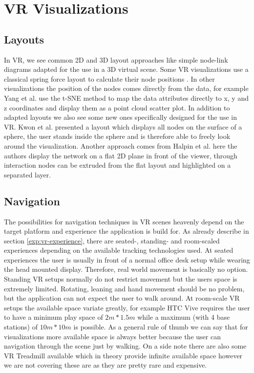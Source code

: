 \section{VR Visualizations}

\subsection{Layouts}

In VR, we see common 2D and 3D layout approaches like simple node-link diagrams adapted for the use in a 3D virtual scene. 
Some VR visualizations use a classical spring force layout to calculate their node positions \cite{drogemuller_examining_2020} \cite{sorger_immersive_2019}.
In other visualizations the position of the nodes comes directly from the data, for example Yang et al. \cite{yang_embodied_2020} use the t-SNE method \cite{maaten_visualizing_2008} to map the data attributes directly to x, y and z coordinates and display them as a point cloud scatter plot.
In addition to adapted layouts we also see some new ones specifically designed for the use in VR. Kwon et al. \cite{kwon_study_2016} presented a layout which displays all nodes on the surface of a sphere, the user stands inside the sphere and is therefore able to freely look around the visualization. Another approach comes from Halpin et al. \cite{halpin_exploring_2008} here the authors display the network on a flat 2D plane in front of the viewer, through interaction nodes can be extruded from the flat layout and highlighted on a separated layer.     

\subsection{Navigation}

The possibilities for navigation techniques in VR scenes heavenly depend on the target platform and experience the application is build for. As already describe in section \ref{exp:vr-experience}, there are seated-, standing- and room-scaled experiences depending on the available tracking technologies used.
At seated experiences the user is usually in front of a normal office desk setup while wearing the head mounted display. Therefore, real world movement is basically no option. 
Standing VR setups normally do not restrict movement but the users space is extremely limited. Rotating, leaning and hand movement should be no problem, but the application can not expect the user to walk around.
At room-scale VR setups the available space variate greatly, for example HTC Vive requires the user to have a minimum play space of $2m * 1.5m$ while a maximum (with 4 base stations) of $10m * 10m$ is possible. As a general rule of thumb we can say that for visualizations more available space is always better because the user can navigation through the scene just by walking.
On a side note there are also some VR Treadmill available which in theory provide infinite available space however we are not covering these are as they are pretty rare and expensive.\\
  



